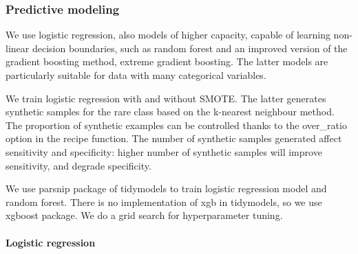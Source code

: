 \documentclass[
]{article}
\begin{document}
\subsubsection{\texorpdfstring{\textbf{Predictive
modeling}}{Predictive modeling}}\label{predictive-modeling}

We use logistic regression, also models of higher capacity, capable of
learning non-linear decision boundaries, such as random forest and an
improved version of the gradient boosting method, extreme gradient
boosting. The latter models are particularly suitable for data with many
categorical variables.

We train logistic regression with and without SMOTE. The latter
generates synthetic samples for the rare class based on the k-nearest
neighbour method. The proportion of synthetic examples can be controlled
thanks to the over\_ratio option in the recipe function. The number of
synthetic samples generated affect sensitivity and specificity: higher
number of synthetic samples will improve sensitivity, and degrade
specificity.

We use parsnip package of tidymodels to train logistic regression model
and random forest. There is no implementation of xgb in tidymodels, so
we use xgboost package. We do a grid search for hyperparameter tuning.

\paragraph{\texorpdfstring{\textbf{Logistic
regression}}{Logistic regression}}\label{logistic-regression}
\end{document}
